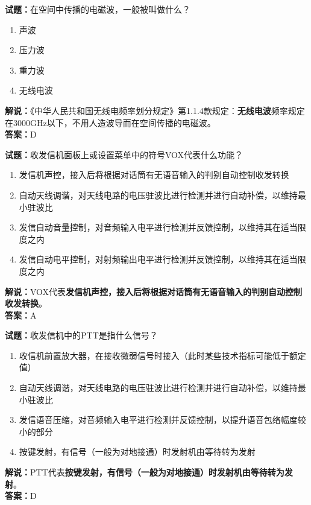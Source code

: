 \documentclass{ctexbook}
\begin{document}
\noindent\textbf{试题：}在空间中传播的电磁波，一般被叫做什么？

\begin{enumerate}[leftmargin=3em]
  \item 声波
  \item 压力波
  \item 重力波
  \item 无线电波
\end{enumerate}

\noindent\textbf{解说：}《中华人民共和国无线电频率划分规定》第1.1.4款规定：\textbf{无线电波}频率规定在3000\si{\GHz}以下，不用人造波导而在空间传播的电磁波。\\\noindent\textbf{答案：}D

\bigskip

\noindent\textbf{试题：}收发信机面板上或设置菜单中的符号VOX代表什么功能？

\begin{enumerate}[leftmargin=3em]
  \item 发信机声控，接入后将根据对话筒有无语音输入的判别自动控制收发转换
  \item 自动天线调谐，对天线电路的电压驻波比进行检测并进行自动补偿，以维持最小驻波比
  \item 发信自动音量控制，对音频输入电平进行检测并反馈控制，以维持其在适当限度之内
  \item 发信自动电平控制，对射频输出电平进行检测并反馈控制，以维持其在适当限度之内
\end{enumerate}

\noindent\textbf{解说：}VOX代表\textbf{发信机声控，接入后将根据对话筒有无语音输入的判别自动控制收发转换}。\\\noindent\textbf{答案：}A

\bigskip

\noindent\textbf{试题：}收发信机中的PTT是指什么信号？

\begin{enumerate}[leftmargin=3em]
  \item 收信机前置放大器，在接收微弱信号时接入（此时某些技术指标可能低于额定值）
  \item 自动天线调谐，对天线电路的电压驻波比进行检测并进行自动补偿，以维持最小驻波比
  \item 发信语音压缩，对音频输入电平进行检测并反馈控制，以提升语音包络幅度较小的部分
  \item 按键发射，有信号（一般为对地接通）时发射机由等待转为发射
\end{enumerate}

\noindent\textbf{解说：}PTT代表\textbf{按键发射，有信号（一般为对地接通）时发射机由等待转为发射}。\\\noindent\textbf{答案：}D
\end{document}
